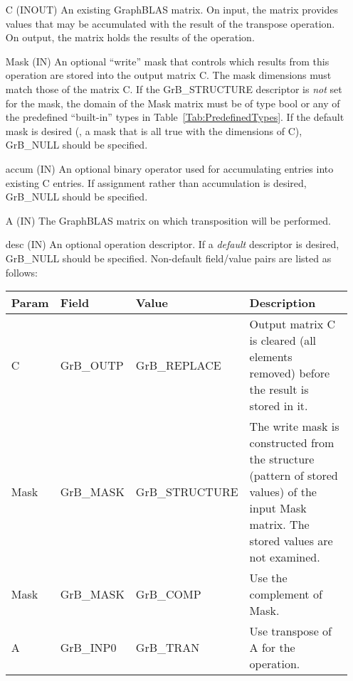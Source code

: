 \begin{itemize}[leftmargin=1.1in]
    \item[{\sf C}]    ({\sf INOUT}) An existing GraphBLAS matrix. On input,
    the matrix provides values that may be accumulated with the result of the
    transpose operation.  On output, the matrix holds the results of the
    operation.

    \item[{\sf Mask}] ({\sf IN}) An optional ``write'' mask that controls which
    results from this operation are stored into the output matrix {\sf C}. The 
    mask dimensions must match those of the matrix {\sf C}. If the 
    {\sf GrB\_STRUCTURE} descriptor is {\em not} set for the mask, the domain of the 
    {\sf Mask} matrix must be of type {\sf bool} or any of the predefined 
    ``built-in'' types in Table~\ref{Tab:PredefinedTypes}.  If the default
    mask is desired (\ie, a mask that is all {\sf true} with the dimensions of {\sf C}), 
    {\sf GrB\_NULL} should be specified.

    \item[{\sf accum}] ({\sf IN}) An optional binary operator used for accumulating
    entries into existing {\sf C} entries.
    If assignment rather than accumulation is
    desired, {\sf GrB\_NULL} should be specified.

    \item[{\sf A}]     ({\sf IN}) The GraphBLAS matrix on which
    transposition will be performed.

    \item[{\sf desc}] ({\sf IN}) An optional operation descriptor. If
    a \emph{default} descriptor is desired, {\sf GrB\_NULL} should be
    specified. Non-default field/value pairs are listed as follows:  \\

    \hspace*{-2em}\begin{tabular}{lllp{2.7in}}
        Param & Field  & Value & Description \\
        \hline
        {\sf C}    & {\sf GrB\_OUTP} & {\sf GrB\_REPLACE} & Output matrix {\sf C}
        is cleared (all elements removed) before the result is stored in it.\\

        {\sf Mask} & {\sf GrB\_MASK} & {\sf GrB\_STRUCTURE}   & The write mask is
        constructed from the structure (pattern of stored values) of the input
        {\sf Mask} matrix. The stored values are not examined.\\

        {\sf Mask} & {\sf GrB\_MASK} & {\sf GrB\_COMP}   & Use the 
        complement of {\sf Mask}. \\

        {\sf A}    & {\sf GrB\_INP0} & {\sf GrB\_TRAN}   & Use transpose of {\sf A}
        for the operation. \\
    \end{tabular}
\end{itemize}

